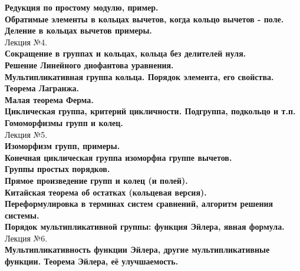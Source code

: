 \documentclass[12pt]{article}
\begin{document}
\textbf{Редукция по простому модулю, пример.}\\

\textbf{Обратимые элементы в кольцах вычетов, когда кольцо вычетов - поле.}\\
\textbf{Деление в кольцах вычетов примеры.}\\

Лекция №4.\\
\textbf{Сокращение в группах и кольцах, кольца без делителей нуля.}\\

\textbf{Решение Линейного диофантова уравнения.}\\

\textbf{Мультипликативная группа кольца. Порядок элемента, его свойства.}\\

\textbf{Теорема Лагранжа.}\\

\textbf{Малая теорема Ферма.}\\

\textbf{Циклическая группа, критерий цикличности. Подгруппа, подкольцо и т.п.}\\

\textbf{Гомоморфизмы групп и колец.}\\

Лекция №5.\\
\textbf{Изоморфизм групп, примеры.}\\

\textbf{Конечная циклическая группа изоморфна группе вычетов.}\\

\textbf{Группы простых порядков.}\\

\textbf{Прямое произведение групп и колец (и полей).}\\

\textbf{Китайская теорема об остатках (кольцевая версия).}\\

\textbf{Переформулировка в терминах систем сравнений, алгоритм решения системы.}\\

\textbf{Порядок мультипликативной группы: функция Эйлера, явная формула.}\\

Лекция №6.\\
\textbf{Мультипликативность функции Эйлера, другие мультипликативные функции. Теорема Эйлера, её улучшаемость.}\\
\end{document}
